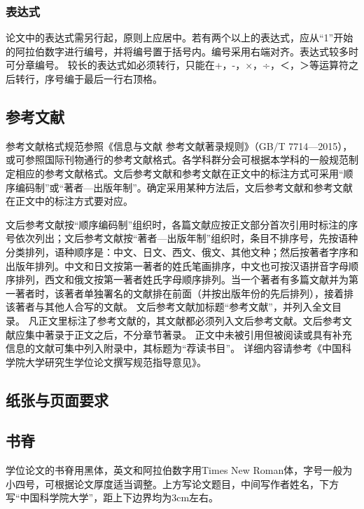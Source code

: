 \subsubsection{表达式}
论文中的表达式需另行起，原则上应居中。若有两个以上的表达式，应从“1”开始的阿拉伯数字进行编号，并将编号置于括号内。编号采用右端对齐。表达式较多时可分章编号。
较长的表达式如必须转行，只能在+，-，×，÷，＜，＞等运算符之后转行，序号编于最后一行右顶格。

\subsection{参考文献}
参考文献格式规范参照《信息与文献 参考文献著录规则》（GB/T 7714—2015），或可参照国际刊物通行的参考文献格式。各学科群分会可根据本学科的一般规范制定相应的参考文献格式。文后参考文献和参考文献在正文中的标注方式可采用“顺序编码制”或“著者—出版年制”。确定采用某种方法后，文后参考文献和参考文献在正文中的标注方式要对应。

文后参考文献按“顺序编码制”组织时，各篇文献应按正文部分首次引用时标注的序号依次列出；文后参考文献按“著者—出版年制”组织时，条目不排序号，先按语种分类排列，语种顺序是：中文、日文、西文、俄文、其他文种；然后按著者字序和出版年排列。中文和日文按第一著者的姓氏笔画排序，中文也可按汉语拼音字母顺序排列，西文和俄文按第一著者姓氏字母顺序排列。当一个著者有多篇文献并为第一著者时，该著者单独署名的文献排在前面（并按出版年份的先后排列），接着排该著者与其他人合写的文献。
文后参考文献加标题“参考文献”，并列入全文目录。
凡正文里标注了参考文献的，其文献都必须列入文后参考文献。文后参考文献应集中著录于正文之后，不分章节著录。
正文中未被引用但被阅读或具有补充信息的文献可集中列入附录中，其标题为“荐读书目”。
详细内容请参考《中国科学院大学研究生学位论文撰写规范指导意见》。
\subsection{纸张与页面要求}
\subsection{书脊}
学位论文的书脊用黑体，英文和阿拉伯数字用Times New Roman体，字号一般为小四号，可根据论文厚度适当调整。上方写论文题目，中间写作者姓名，下方写“中国科学院大学”，距上下边界均为3cm左右。